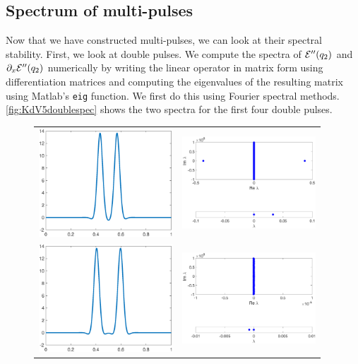 \documentclass[thesis.tex]{subfiles}
\begin{document}
\subsection{Spectrum of multi-pulses}

Now that we have constructed multi-pulses, we can look at their spectral stability. First, we look at double pulses. We compute the spectra of $\mathcal{E}''(q_2)$ and $\partial_x \mathcal{E}''(q_2)$ numerically by writing the linear operator in matrix form using differentiation matrices and computing the eigenvalues of the resulting matrix using Matlab's \texttt{eig} function. We first do this using Fourier spectral methods. \cref{fig:KdV5doublespec} shows the two spectra for the first four double pulses.

\begin{figure}[H]
\begin{center}
\begin{tabular}{cc}
\includegraphics[width=5cm]{images/kdv5numerics/double1} &
\includegraphics[width=5cm]{images/kdv5numerics/double1spec} \\
\includegraphics[width=5cm]{images/kdv5numerics/double2} &
\includegraphics[width=5cm]{images/kdv5numerics/double2spec} \\

\end{tabular}
\end{center}
\end{figure}
\end{document}
